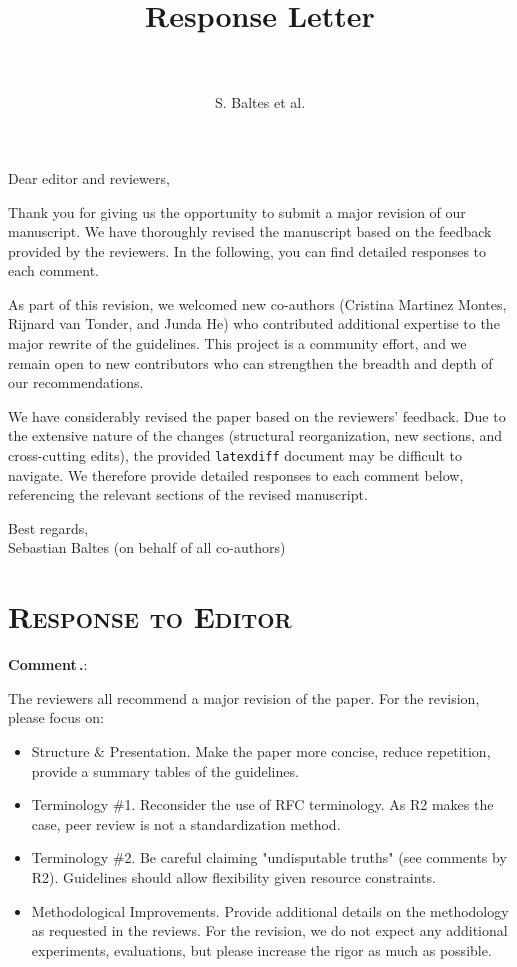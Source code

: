 \documentclass[11pt]{article}
\author{S. Baltes et al.}
\title{%
  \textbf{Response Letter}\\
  \papertitle\\
  {\large \paperid}
}
\makeatletter
\newcounter{reviewer}
\newcounter{comment}[reviewer]
\renewcommand{\thecomment}{Comment\,\thereviewer.\arabic{comment}}
\newenvironment{reviewcomment}
{%
  \refstepcounter{comment}%
  \begingroup
    \edef\@tempa{comment:\thereviewer.\arabic{comment}}%
    \label{\@tempa}%
  \endgroup
  \needspace{8\baselineskip}%
  \bigskip\noindent
  \textbf{\thecomment}:%
  \begin{commentquote}{}%
}%
{%
  \end{commentquote}%
  \medskip\par
}
\makeatother
\begin{document}
\maketitle

\noindent Dear editor and reviewers,

\medskip
\noindent Thank you for giving us the opportunity to submit a major revision of our manuscript.
We have thoroughly revised the manuscript based on the feedback provided by the reviewers.
In the following, you can find detailed responses to each comment.

\noindent As part of this revision, we welcomed new co-authors (Cristina Martinez Montes, Rijnard van Tonder, and Junda He) who contributed additional expertise to the major rewrite of the guidelines. This project is a community effort, and we remain open to new contributors who can strengthen the breadth and depth of our recommendations.

\noindent We have considerably revised the paper based on the reviewers' feedback. Due to the extensive nature of the changes (structural reorganization, new sections, and cross-cutting edits), the provided \texttt{latexdiff} document may be difficult to navigate. We therefore provide detailed responses to each comment below, referencing the relevant sections of the revised manuscript.

\medskip
\noindent Best regards,\\
Sebastian Baltes (on behalf of all co-authors)

\section*{\textsc{Response to Editor}}

\vspace{-0.75\baselineskip}

\begin{reviewcomment}
The reviewers all recommend a major revision of the paper. For the revision, please focus on:

\begin{itemize}
    \item Structure \& Presentation. Make the paper more concise, reduce repetition, provide a summary tables of the guidelines.
    \item Terminology \#1. Reconsider the use of RFC terminology. As R2 makes the case, peer review is not a standardization method.
    \item Terminology \#2. Be careful claiming "undisputable truths" (see comments by R2). Guidelines should allow flexibility given resource constraints.
    \item Methodological Improvements. Provide additional details on the methodology as requested in the reviews. For the revision, we do not expect any additional experiments, evaluations, but please increase the rigor as much as possible.
\end{itemize}

\end{reviewcomment}
\end{document}
